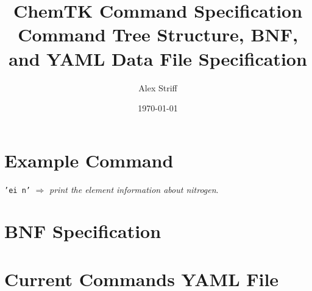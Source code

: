 \documentclass[final,letterpaper,12pt]{article}
\author{Alex Striff}
\title{ChemTK Command Specification \\ \large
Command Tree Structure, BNF, and YAML Data File Specification}
\date \today
\begin{document}
\maketitle
\clearpage


\section{Example Command}

\texttt{'ei n'} $\Rightarrow$ \textit{print the element information about
nitrogen}.


\section{BNF Specification}

\lstset{numbers=left, numberstyle=\small}
\texttt{}


\section{Current Commands YAML File}

\lstset{numbers=left, numberstyle=\small}
\texttt{}
\end{document}
